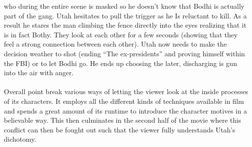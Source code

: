 \documentclass[fleqn,14pt]{article}
\begin{document}
who during the entire scene is masked so he doesn't know that Bodhi is actually part of the gang. Utah hesitates to pull the trigger as
he Is reluctant to kill. As a result he stares the man climbing the fence directly into the eyes realizing that it is in fact Bothy.
They look at each other for a few seconds (showing that they feel a strong connection between each other).
Utah now needs to make the decision weather to shot (ending “The ex-presidents” and proving himself within the FBI) or to let Bodhi go.
He ends up choosing the later, discharging is gun into the air with anger.\\
\\
Overall point break various ways of letting the viewer look at the inside processes of its characters. It employs all the different kinds of techniques available in film and spends a great amount of its runtime to introduce the character motives in a believable way. This then culminates in the second half of the movie where this conflict can then be fought out such that the viewer fully understands Utah's dichotomy.



\printbibliography 
\end{document}
